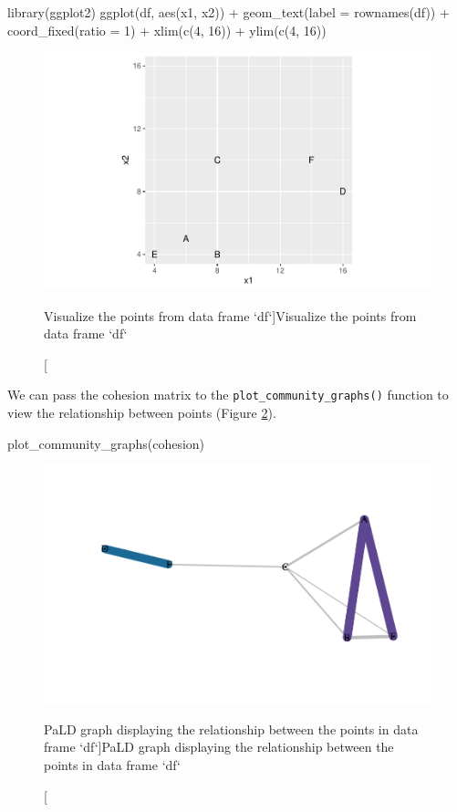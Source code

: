 \begin{Schunk}
\begin{Sinput}
library(ggplot2)
ggplot(df, aes(x1, x2)) +
  geom_text(label = rownames(df)) + 
  coord_fixed(ratio = 1) + 
  xlim(c(4, 16)) + 
  ylim(c(4, 16))
\end{Sinput}
\begin{figure}
\includegraphics{manuscript_files/figure-latex/fig1-1} \caption[Visualize the points from data frame `df`]{Visualize the points from data frame `df`}\label{fig:fig1}
\end{figure}
\end{Schunk}

We can pass the cohesion matrix to the
\texttt{plot\_community\_graphs()} function to view the relationship
between points (Figure \ref{fig:fig2}).

\begin{Schunk}
\begin{Sinput}
plot_community_graphs(cohesion)
\end{Sinput}
\begin{figure}
\includegraphics{manuscript_files/figure-latex/fig2-1} \caption[PaLD graph displaying the relationship between the points in data frame `df`]{PaLD graph displaying the relationship between the points in data frame `df`}\label{fig:fig2}
\end{figure}
\end{Schunk}

